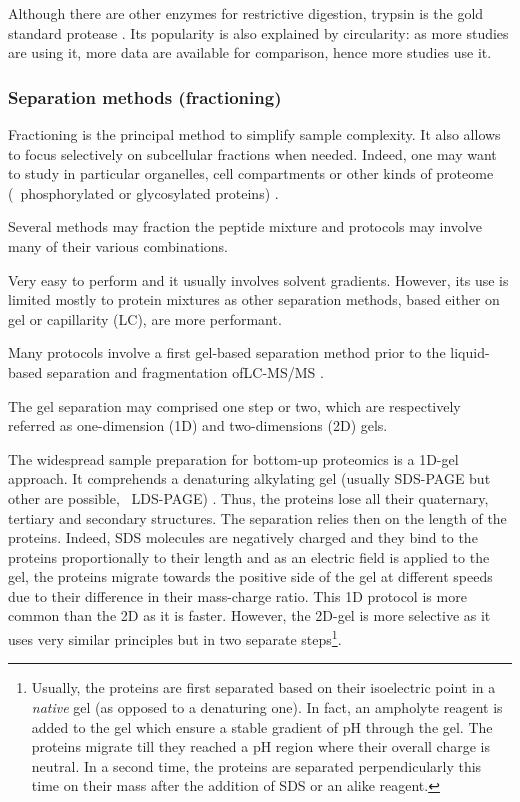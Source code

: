 Although there are other enzymes for restrictive digestion, trypsin is the gold
standard protease . Its popularity is also explained by
circularity: as more studies are using it, more data are available for comparison,
hence more studies use it.

\subsubsection{Separation methods (fractioning)}\label{subsub:sepMethods}
Fractioning is the principal method to simplify sample complexity. It also allows
to focus selectively on subcellular fractions when needed. Indeed, one may want
to study in particular organelles, cell compartments or other kinds of proteome
(\eg\ phosphorylated or glycosylated proteins) .

Several methods may fraction the peptide mixture and protocols may
involve many of their various combinations.

Very easy to perform and it usually involves solvent gradients. However,
its use is limited mostly to protein mixtures as other separation methods,
based either on gel or capillarity (\gls{LC}), are more performant.

Many protocols involve a first gel-based separation method prior to the
liquid-based separation and fragmentation of\enspace\gls{LC-MS/MS}
.

The gel separation may comprised one step or two, which are respectively referred
as one-dimension (1D) and two-dimensions (2D) gels.

The widespread sample preparation for bottom-up proteomics is a 1D-gel approach.
It comprehends a denaturing alkylating gel (usually \gls{SDS-PAGE} but other are
possible, \eg\ \gls{LDS-PAGE}) . Thus, the proteins lose
all their quaternary, tertiary and secondary structures. The separation relies
then on the length of the proteins. Indeed, \gls{SDS} molecules are negatively
charged and they bind to the proteins proportionally to their length and as an
electric field is applied to the gel, the proteins migrate towards the positive
side of the gel at different speeds due to their difference in their mass-charge
ratio. This 1D protocol is more common than the 2D as it is faster. However, the
2D-gel is more selective as it uses very similar principles but in two separate
steps\footnote{Usually, the proteins are first separated based on their
isoelectric point in a \emph{native} gel (as opposed to a denaturing one).
In fact, an \gls{ampholyte} reagent is added to the gel which ensure a stable
gradient of \gls{pH} through the gel. The proteins migrate till they reached a
\gls{pH} region where their overall charge is neutral. In a second time, the
proteins are separated perpendicularly this time on their mass after the addition
of \gls{SDS} or an alike reagent.}.

